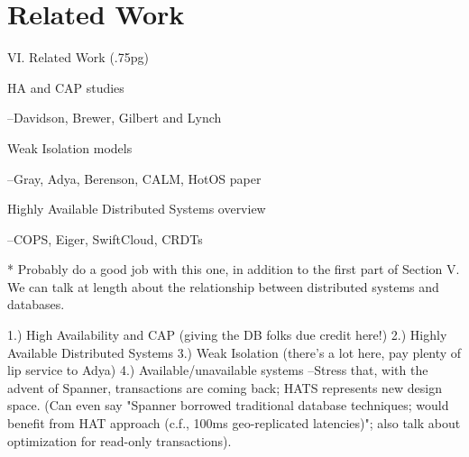 
\section{Related Work}

VI. Related Work (.75pg)

HA and CAP studies

--Davidson, Brewer, Gilbert and Lynch

Weak Isolation models

--Gray, Adya, Berenson, CALM, HotOS paper

Highly Available Distributed Systems overview

--COPS, Eiger, SwiftCloud, CRDTs

* Probably do a good job with this one, in addition to the first part of Section V. We can talk at length about the relationship between distributed systems and databases.

1.) High Availability and CAP (giving the DB folks due credit here!)
2.) Highly Available Distributed Systems
3.) Weak Isolation (there's a lot here, pay plenty of lip service to Adya)
4.) Available/unavailable systems
	--Stress that, with the advent of Spanner, transactions are coming back; HATS represents new design space. (Can even say "Spanner borrowed traditional database techniques; would benefit from HAT approach (c.f., 100ms geo-replicated latencies)"; also talk about optimization for read-only transactions).
